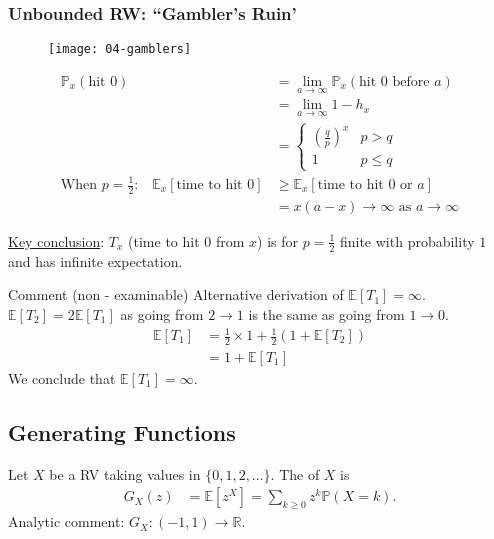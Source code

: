 \subsubsection{Unbounded RW: ``Gambler's Ruin'}

\begin{figure}[h] 
    \centering 
    \texttt{[image: 04-gamblers]} 
\end{figure}

\begin{align*}
    \mathbb{P}_x(\text{hit } 0) &= \lim_{a \to \infty} \mathbb{P}_x(\text{hit $0$ before $a$}) \\
    &= \lim_{a \to \infty} 1 - h_x \\
    &= \begin{cases}
        (\frac{q}{p})^x & p > q \\
        1 & p \leq q
    \end{cases} \\
    \text{When $p = \frac{1}{2}$:} \quad \mathbb{E}_x[\text{time to hit } 0] &\geq \mathbb{E}_x[\text{time to hit $0$ or $a$}] \\
    &= x(a-x) \to \infty \text{ as } a \to \infty
\end{align*} 

\underline{Key conclusion}: $T_x$ (time to hit $0$ from $x$) is for $p = \frac{1}{2}$ finite with probability $1$ and has infinite expectation.

\begin{aside}{Comment (non - examinable)}
    Alternative derivation of $\mathbb{E}[T_1] = \infty$. \\
    $\mathbb{E}[T_2] = 2 \mathbb{E}[T_1]$ as going from $2 \to 1$ is the same as going from $1 \to 0$.
    \begin{align*}
        \mathbb{E}[T_1] &= \frac{1}{2} \times 1 + \frac{1}{2} \left( 1 + \mathbb{E}[T_2] \right) \\
        &= 1 + \mathbb{E}[T_1]
    \end{align*} 
    We conclude that $\mathbb{E}[T_1] = \infty$. \\
\end{aside} 

\subsection{Generating Functions}

\begin{definition}
    Let $X$ be a RV taking values in $\{0, 1, 2, \dots\}$. The  of $X$ is 
    \begin{align*}
        G_X(z) &= \mathbb{E}\left[ z^X \right] = \sum_{k \geq 0} z^k \mathbb{P}(X = k). 
    \end{align*} 
    Analytic comment: $G_X : (-1, 1) \to \mathbb{R}$.
\end{definition} 

